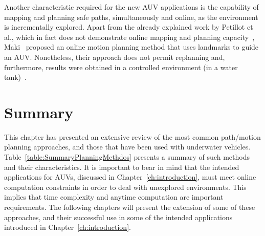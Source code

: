 
Another characteristic required for the new \ac{AUV} applications is the
capability of mapping and planning safe paths, simultaneously and online, as the
environment is incrementally explored. Apart from the already explained work by
Petillot et al., which in fact does not demonstrate online mapping and planning
capacity~\cite{Petillot2001}, Maki \etal~proposed an online motion planning
method that uses landmarks to guide an \ac{AUV}. Nonetheless, their approach does not
permit replanning and, furthermore, results were obtained in a controlled
environment (\ie in a water tank)~\cite{Maki2007}.

\section{Summary}

This chapter has presented an extensive review of the most common path/motion
planning approaches, and those that have been used with underwater vehicles.
Table~\ref{table:SummaryPlanningMethdos} presents a summary of such methods and
their characteristics. It is important to bear in mind that the intended
applications for \acp{AUV}, discussed in Chapter~\ref{ch:introduction}, must
meet online computation constraints in order to deal with unexplored
environments. This implies that time complexity and anytime computation are
important requirements. The following chapters will present the extension of
some of these approaches, and their successful use in some of the intended
applications introduced in Chapter~\ref{ch:introduction}.

